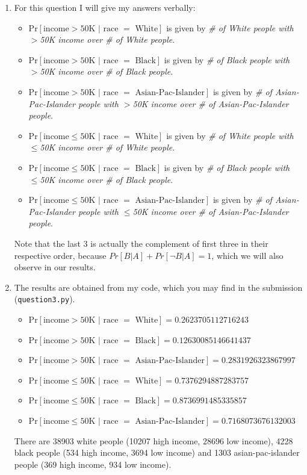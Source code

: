 \documentclass[12pt,reqno]{amsart}
\newcommand{\code}[1]{\texttt{#1}}
\begin{document}
\begin{enumerate}[label=\alph*.]
 	\item For this question I will give my answers verbally:
 	\begin{itemize}
 		\item $\text{Pr}[\text{income}>50\text{K }|\text{ race }=\text{ White}]$ is given by \textit{\# of White people with $>$50K income over \# of White people}.
 		\item $\text{Pr}[\text{income}>50\text{K }|\text{ race }=\text{ Black}]$ is given by \textit{\# of Black people with $>$50K income over \# of Black people}.
 		\item $\text{Pr}[\text{income}>50\text{K }|\text{ race }=\text{ Asian-Pac-Islander}]$ is given by \textit{\# of Asian-Pac-Islander people with $>$50K income over \# of Asian-Pac-Islander people}.
 		\item $\text{Pr}[\text{income}\leq50\text{K }|\text{ race }=\text{ White}]$ is given by \textit{\# of White people with $\leq$50K income over \# of White people}.
 		\item $\text{Pr}[\text{income}\leq50\text{K }|\text{ race }=\text{ Black}]$ is given by \textit{\# of Black people with $\leq$50K income over \# of Black people}.
 		\item $\text{Pr}[\text{income}\leq50\text{K }|\text{ race }=\text{ Asian-Pac-Islander}]$ is given by \textit{\# of Asian-Pac-Islander people with $\leq$50K income over \# of Asian-Pac-Islander people}.
 	\end{itemize}
	Note that the last 3 is actually the complement of first three in their respective order, because $Pr[B | A] + Pr[\neg B | A] = 1$, which we will also observe in our results. 
 	
 	\item The results are obtained from my code, which you may find in the submission (\code{question3.py}).
 	\begin{itemize}
 		\item $\text{Pr}[\text{income}>50\text{K }|\text{ race }=\text{ White}] = 0.2623705112716243$
 		\item $\text{Pr}[\text{income}>50\text{K }|\text{ race }=\text{ Black}] = 0.12630085146641437$  
 		\item $\text{Pr}[\text{income}>50\text{K }|\text{ race }=\text{ Asian-Pac-Islander}] = 0.2831926323867997$  
 		\item $\text{Pr}[\text{income}\leq50\text{K }|\text{ race }=\text{ White}] = 0.7376294887283757$ 
 		\item $\text{Pr}[\text{income}\leq50\text{K }|\text{ race }=\text{ Black}] = 0.8736991485335857$  
 		\item $\text{Pr}[\text{income}\leq50\text{K }|\text{ race }=\text{ Asian-Pac-Islander}] = 0.7168073676132003$ 
 	\end{itemize}
 	There are 38903 white people (10207 high income, 28696 low income), 4228 black people (534 high income, 3694 low income) and 1303 asian-pac-islander people (369 high income, 934 low income).
 	

\end{enumerate}
\end{document}
